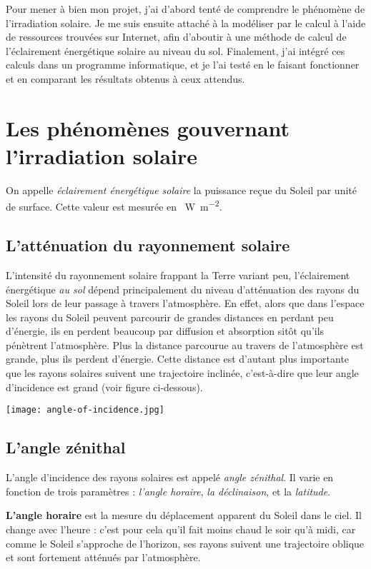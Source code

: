 \documentclass[12pt]{article}
\begin{document}
Pour mener à bien mon projet, j'ai d'abord tenté de comprendre le phénomène de l'irradiation solaire.
Je me suis ensuite attaché à la modéliser par le calcul à l'aide de ressources trouvées sur Internet, afin d'aboutir à une méthode de calcul de l'éclairement énergétique solaire au niveau du sol.
Finalement, j'ai intégré ces calculs dans un programme informatique, et je l'ai testé en le faisant fonctionner et en comparant les résultats obtenus à ceux attendus.


\section{Les phénomènes gouvernant l'irradiation solaire}

On appelle \emph{éclairement énergétique solaire} la puissance reçue du Soleil par unité de surface.
Cette valeur est mesurée en \SI{}{\watt\per\square\meter}.

\subsection{L'atténuation du rayonnement solaire}
\label{sec:attenuation-rayonnement}
L'intensité du rayonnement solaire frappant la Terre variant peu, l'éclairement énergétique \emph{au sol} dépend principalement du niveau d'atténuation des rayons du Soleil lors de leur passage à travers l'atmosphère.
En effet, alors que dans l'espace les rayons du Soleil peuvent parcourir de grandes distances en perdant peu d'énergie, ils en perdent beaucoup par diffusion et absorption sitôt qu'ils pénètrent l'atmosphère.
Plus la distance parcourue au travers de l'atmosphère est grande, plus ils perdent d'énergie.
Cette distance est d'autant plus importante que les rayons solaires suivent une trajectoire inclinée, c'est-à-dire que leur angle d'incidence est grand (voir figure ci-dessous).

\centerline{\texttt{[image: angle-of-incidence.jpg]}}


\subsection{L'angle zénithal}
\label{sec:zenith-angle}
L'angle d'incidence des rayons solaires est appelé \emph{angle zénithal}.
Il varie en fonction de trois paramètres : \emph{l'angle horaire}, \emph{la déclinaison}, et la \emph{latitude}.

\textbf{L'angle horaire} est la mesure du déplacement apparent du Soleil dans le ciel. 
Il change avec l'heure : c'est pour cela qu'il fait moins chaud le soir qu'à midi, car comme le Soleil s'approche de l'horizon, ses rayons suivent une trajectoire oblique et sont fortement atténués par l'atmosphère.
\end{document}
